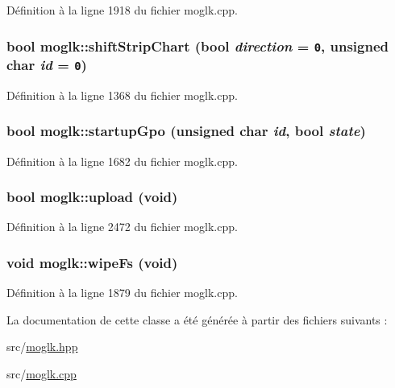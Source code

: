 Définition à la ligne 1918 du fichier moglk.cpp.\hypertarget{classmoglk_0092806e3cf33100936dd48cc1bbe1ae}{
\subsubsection[{shiftStripChart}]{\setlength{\rightskip}{0pt plus 5cm}bool moglk::shiftStripChart (bool {\em direction} = {\tt 0}, \/  unsigned char {\em id} = {\tt 0})}}
\label{classmoglk_0092806e3cf33100936dd48cc1bbe1ae}




Définition à la ligne 1368 du fichier moglk.cpp.\hypertarget{classmoglk_b5a54b14d6bb193873f2309474778849}{
\subsubsection[{startupGpo}]{\setlength{\rightskip}{0pt plus 5cm}bool moglk::startupGpo (unsigned char {\em id}, \/  bool {\em state})}}
\label{classmoglk_b5a54b14d6bb193873f2309474778849}




Définition à la ligne 1682 du fichier moglk.cpp.\hypertarget{classmoglk_a133809f7d934231f03f1d59fbc88f75}{
\subsubsection[{upload}]{\setlength{\rightskip}{0pt plus 5cm}bool moglk::upload (void)}}
\label{classmoglk_a133809f7d934231f03f1d59fbc88f75}




Définition à la ligne 2472 du fichier moglk.cpp.\hypertarget{classmoglk_de1cb00a156f01b9948b7ade18a6754b}{
\subsubsection[{wipeFs}]{\setlength{\rightskip}{0pt plus 5cm}void moglk::wipeFs (void)}}
\label{classmoglk_de1cb00a156f01b9948b7ade18a6754b}




Définition à la ligne 1879 du fichier moglk.cpp.

La documentation de cette classe a été générée à partir des fichiers suivants :\begin{CompactItemize}
\item 
src/\hyperlink{moglk_8hpp}{moglk.hpp}\item 
src/\hyperlink{moglk_8cpp}{moglk.cpp}\end{CompactItemize}
